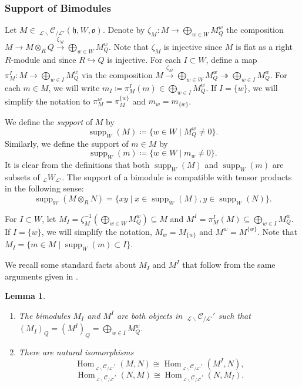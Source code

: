 \documentclass{amsart}
\newcommand{\scrL}{\mathcal{L}}
\DeclareMathOperator{\Hom}{Hom}
\DeclareMathOperator{\supp}{supp}
\newcommand{\fr}[1]{\mathfrak{#1}}
\newcommand{\Cmon}[2]{\:_{#1 \backslash} \mathcal{C}_{/ #2} }
\newcommand{\W}[2]{{}_{#1}W_{#2}}
\newtheorem{lemma}[subsubsection]{Lemma}
\theoremstyle{definition}
\numberwithin{equation}{subsection}
\begin{document}
\subsubsection{Support of Bimodules}\label{subsec:support_of_bims}

Let $M \in \Cmon{\scrL}{\scrL'} (\fr{h}, W, \fr{o})$. 
Denote by $\zeta_M : M \to \bigoplus_{w \in W} M_Q^w$ the composition $M \to M \otimes_R Q \stackrel{\xi_M}{\to} \bigoplus_{w \in W} M_Q^w$.
Note that $\zeta_M$ is injective since $M$ is flat as a right $R$-module and since $R \hookrightarrow Q$ is injective.
For each $I \subset W$, define a map $\pi_M^I : M \to \bigoplus_{w \in  I} M_Q^w$ via the composition $M \stackrel{\zeta_M}{\to} \bigoplus_{w \in W} M_Q^w \twoheadrightarrow \bigoplus_{w \in I} M_Q^w.$
For each $m \in M$, we will write $m_I \coloneq \pi_M^I (m) \in \bigoplus_{w \in I} M_Q^w$.
If $I = \{w\}$, we will simplify the notation to $\pi_M^w = \pi_M^{\{w\}}$ and $m_w = m_{\{w\}}$.

We define the \emph{support} of $M$ by
\[ \supp_W (M) \coloneq \{ w \in W \mid M_Q^w \neq 0 \}. \]
Similarly, we define the support of $m \in M$ by
\[\supp_W (m) \coloneq \{w \in W \mid m_w \neq 0\}.\]
It is clear from the definitions that both $\supp_W (M)$ and $\supp_W (m)$ are subsets of $\W{\scrL}{\scrL'}$. 
The support of a bimodule is compatible with tensor products in the following sense:
\begin{equation}\label{eq:tensor_and_support}
    \supp_W (M \otimes_R N) = \{xy \mid x \in \supp_W (M), y \in \supp_W (N) \}.
\end{equation}

For $I \subset W$, let $M_I = \zeta_M^{-1} \left( \bigoplus_{w \in W} M_Q^w \right) \subseteq M$ and $M^I = \pi_M^I (M) \subseteq \bigoplus_{w \in I} M_Q^w$.
If $I = \{w\}$, we will simplify the notation, $M_w = M_{\{w\}}$ and $M^w = M^{\{w\}}$. Note that $M_I = \{m \in M \mid \supp_W (m) \subset I\}$.

We recall some standard facts about $M_I$ and $M^I$ that follow from the same arguments given in \cite[\S2.2]{Abe19}.

\begin{lemma}\label{lem:std_facts_about_inv_and_coinvs}
    \begin{enumerate}
        Let $I \subseteq W$ and $M, N \in \Cmon{\scrL}{\scrL'} (\fr{h}, W, \fr{o})$ such that $\supp_W (N) \subset I$.
        \item The bimodules $M_I$ and $M^I$ are both objects in $\Cmon{\scrL}{\scrL'}' $ such that  $(M_I)_Q = (M^I)_Q = \bigoplus_{w \in I} M_Q^w$.
        \item There are natural isomorphisms
        \[\Hom_{\Cmon{\scrL}{\scrL'}'} (M, N) \cong \Hom_{\Cmon{\scrL}{\scrL'}'} (M^I, N),\]
        \[\Hom_{\Cmon{\scrL}{\scrL'}'} (N, M) \cong \Hom_{\Cmon{\scrL}{\scrL'}'} (N, M_I).\]
    \end{enumerate}
\end{lemma}
\end{document}
